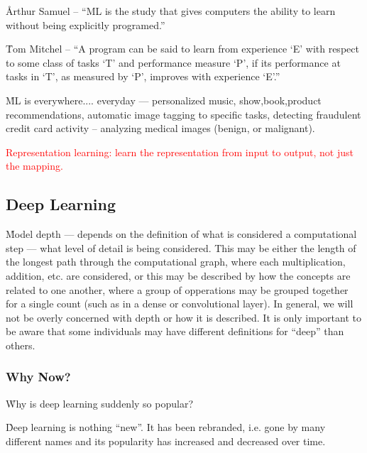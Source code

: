 \r{Arthur Samuel -- ``ML is the study that gives computers the ability to learn without being explicitly programed.''}

\r{Tom Mitchel -- ``A program can be said to learn from experience `E' with respect to some class of tasks `T' and performance measure `P', if its performance at tasks in `T', as measured by `P', improves with experience `E'.''}

\r{ML is everywhere.... everyday --- personalized music, show,book,product recommendations, automatic image tagging to specific tasks, detecting fraudulent credit card activity -- analyzing medical images (benign, or malignant). }


\textcolor{red}{Representation learning: learn the representation from input to output, not just the mapping.}



\subsection{Deep Learning}

\r{Model depth --- depends on the definition of what is considered a computational step --- what level of detail is being considered. This may be either the length of the longest path through the computational graph, where each multiplication, addition, etc. are considered, or this may be described by how the concepts are related to one another, where a group of opperations may be grouped together for a single count (such as in a dense or convolutional layer). In general, we will not be overly concerned with depth or how it is described. It is only important to be aware that some individuals may have different definitions for ``deep'' than others.}

\subsubsection{Why Now?}

\r{Why is deep learning suddenly so popular?}

\r{Deep learning is nothing ``new''. It has been rebranded, i.e. gone by many different names  and its popularity has increased and decreased over time.}

